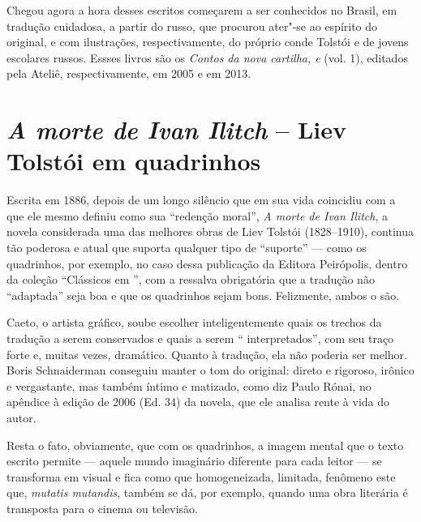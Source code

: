 {{Chegou agora a hora desses escritos começarem a ser conhecidos no Brasil,
em tradução cuidadosa, a partir do russo, que procurou ater"-se ao
espírito do original, e com ilustrações, respectivamente, do próprio
conde Tolstói e de jovens escolares russos. Essses livros são os
\emph{Contos da nova cartilha,  e } (vol. 1), editados pela Ateliê,
respectivamente, em 2005 e em 2013.



\chapter{\emph{A morte de Ivan Ilitch} -- Liev Tolstói em quadrinhos}

Escrita em 1886, depois de um longo silêncio que em sua vida coincidiu
com a que ele mesmo definiu como sua ``redenção moral'', \emph{A morte
de Ivan Ilitch}, a novela considerada uma das melhores obras de Liev
Tolstói (1828--1910), continua tão poderosa e atual que suporta qualquer
tipo de ``suporte'' --- como os quadrinhos, por exemplo, no caso dessa
publicação da Editora Peirópolis, dentro da coleção ``Clássicos em
'', com a ressalva obrigatória que a tradução não ``adaptada'' seja
boa e que os quadrinhos sejam bons. Felizmente, ambos o são.

Caeto, o artista gráfico, soube escolher inteligentemente quais os
trechos da tradução a serem conservados e quais a serem ``
interpretados'', com seu traço forte e, muitas vezes, dramático. Quanto
à tradução, ela não poderia ser melhor. Boris Schnaiderman conseguiu
manter o tom do original: direto e rigoroso, irônico e vergastante, mas
também íntimo e matizado, como diz Paulo Rónai, no apêndice à edição de
2006 (Ed. 34) da novela, que ele analisa rente à vida do autor.

Resta o fato, obviamente, que com os quadrinhos, a imagem mental que o
texto escrito permite --- aquele mundo imaginário diferente para cada
leitor --- se transforma em visual e fica como que homogeneizada,
limitada, fenômeno este que, \emph{mutatis mutandis}, também se dá, por
exemplo, quando uma obra literária é transposta para o cinema ou televisão.

}}
